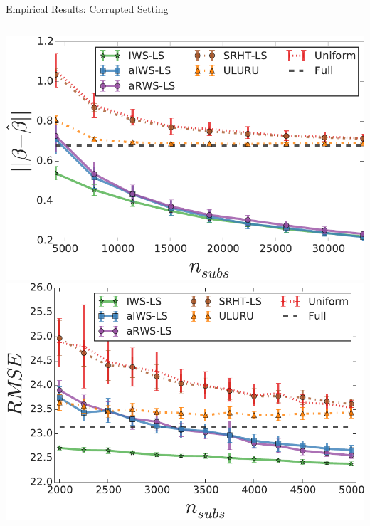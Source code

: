 \documentclass[final,t,english,professionalfonts, xcolor=dvipsnames]{beamer}
\begin{document}
\begin{frame}{}
{\begin{minipage}[c]{0.96\linewidth}
\begin{columns}[t]
\begin{column}{.33\linewidth}
\begin{exampleblock}{Empirical Results: Corrupted Setting}
\begin{columns}
\vspace{-2cm}
\center{}
\includegraphics[width=\textwidth]{figures/nips_true_model-n100000-p500-corruption-n_corrupt5000_norm_diff}
\vspace{-2cm}
\center{}
\includegraphics[width=\textwidth]{figures/airline-delay-prediction_test_error}
\end{columns}
\end{exampleblock}



\end{column}
\end{columns}
\end{minipage}}
\end{frame}
\end{document}
